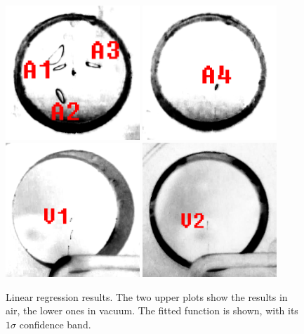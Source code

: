 \documentclass[
	paper=A4,
	parskip=full,
	chapterprefix=true,
	11pt,
	headings=normal,
	bibliography=totoc,
	listof=totoc,
	titlepage=on,
]{scrreprt}
\begin{document}
\begin{figure}
	\centering
	\includegraphics[width=0.45\textwidth]{air_1}
	\includegraphics[width=0.45\textwidth]{air_2} \\
	\includegraphics[width=0.45\textwidth]{vacuum_1} 
	\includegraphics[width=0.45\textwidth]{vacuum_2} \\
	\caption{Linear regression results. The two upper plots show the results in air, the lower ones in vacuum. The fitted function is shown, with its $1 \sigma$ confidence band.}
	\label{fig:particle_photos}
\end{figure}
\end{document}
